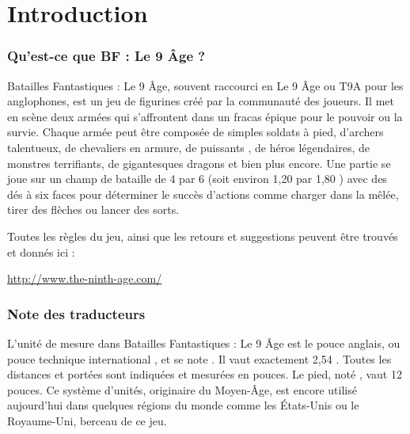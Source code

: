 
\part{Introduction}

\section{Qu'est-ce que BF : Le 9\ieme{} Âge ?}

Batailles Fantastiques : Le 9\ieme{} Âge, souvent raccourci en Le 9\ieme{} Âge ou T9A pour les anglophones, est un jeu de figurines créé par la communauté des joueurs. Il met en scène deux armées qui s'affrontent dans un fracas épique pour le pouvoir ou la survie. Chaque armée peut être composée de simples soldats à pied, d'archers talentueux, de chevaliers en armure, de puissants \expandafter\lowercase\expandafter{\wizards}, de héros légendaires, de monstres terrifiants, de gigantesques dragons et bien plus encore. Une partie se joue sur un champ de bataille de \unit{4}{\foot} par \unit{6}{\foot} (soit environ 1,20 {\meter} par 1,80 {\meter}) avec des dés à six faces pour déterminer le succès d'actions comme charger dans la mêlée, tirer des flèches ou lancer des sorts.

Toutes les règles du jeu, ainsi que les retours et suggestions peuvent être trouvés et donnés ici :

\begin{center}
\url{http://www.the-ninth-age.com/}
\end{center}

\newpage
\section{Note des traducteurs}

L'unité de mesure dans Batailles Fantastiques : Le 9\ieme{} Âge est le pouce anglais, ou \og pouce technique international \fg{}, et se note \inch{}. Il vaut exactement 2,54 {\centi\meter}. Toutes les distances et portées sont indiquées et mesurées en pouces. Le pied, noté \foot{}, vaut 12 pouces. Ce système d'unités, originaire du Moyen-Âge, est encore utilisé aujourd'hui dans quelques régions du monde comme les États-Unis ou le Royaume-Uni, berceau de ce jeu.


